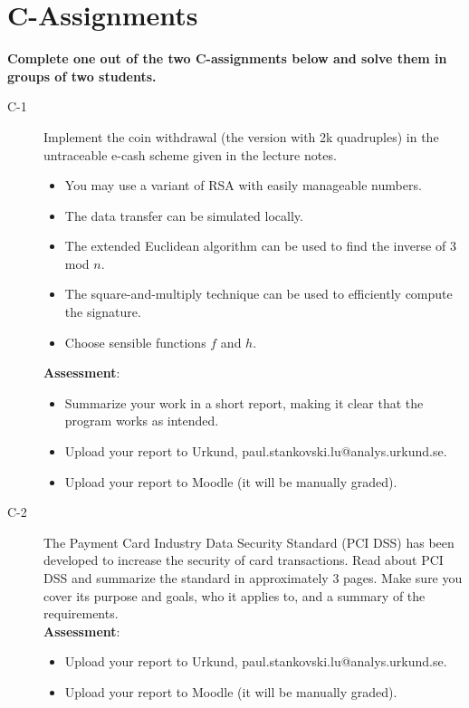 \documentclass{article}
\begin{document}
\clearpage

\section*{C-Assignments}
\textbf{Complete one out of the two C-assignments below and solve them in groups of two students.}

\begin{description}
	\item[C-1]{Implement the coin withdrawal (the version with 2k quadruples) in the untraceable e-cash
	scheme given in the lecture notes.
	\begin{itemize}
		\item You may use a variant of RSA with easily manageable numbers.
		\item The data transfer can be simulated locally.
		\item The extended Euclidean algorithm can be used to find the inverse of 3 mod $n$.
		\item The square-and-multiply technique can be used to efficiently compute the signature.
		\item Choose sensible functions $f$ and $h$.
	\end{itemize}

	\textbf{Assessment}:
	\begin{itemize}
		\item Summarize your work in a short report, making it clear that the program works as intended.
		\item Upload your report to Urkund, paul.stankovski.lu@analys.urkund.se.
		\item Upload your report to Moodle (it will be manually graded).
	\end{itemize}
	}

	\item[C-2]{The Payment Card Industry Data Security Standard (PCI DSS) has been developed to increase the security of card transactions. 
	Read about PCI DSS and summarize the standard in approximately 3 pages. Make sure you cover its purpose and goals, who it applies to, and a summary of the requirements.\\
	\textbf{Assessment}:
	\begin{itemize}
		\item Upload your report to Urkund, paul.stankovski.lu@analys.urkund.se.
		\item Upload your report to Moodle (it will be manually graded).
	\end{itemize}
	}
\end{description}
\end{document}
